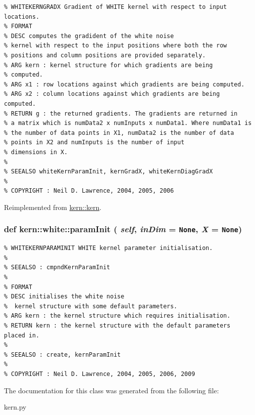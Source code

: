 \footnotesize\begin{verbatim}% WHITEKERNGRADX Gradient of WHITE kernel with respect to input locations.
% FORMAT
% DESC computes the gradident of the white noise
% kernel with respect to the input positions where both the row
% positions and column positions are provided separately.
% ARG kern : kernel structure for which gradients are being
% computed.
% ARG x1 : row locations against which gradients are being computed.
% ARG x2 : column locations against which gradients are being computed.
% RETURN g : the returned gradients. The gradients are returned in
% a matrix which is numData2 x numInputs x numData1. Where numData1 is
% the number of data points in X1, numData2 is the number of data
% points in X2 and numInputs is the number of input
% dimensions in X.
%
% SEEALSO whiteKernParamInit, kernGradX, whiteKernDiagGradX
%
% COPYRIGHT : Neil D. Lawrence, 2004, 2005, 2006

\end{verbatim}
\normalsize
 

Reimplemented from \hyperlink{classkern_1_1kern}{kern::kern}.\hypertarget{classkern_1_1white_c9ce06fb072cdb4e1d769a8a926cc6fc}{
\subsubsection[{paramInit}]{\setlength{\rightskip}{0pt plus 5cm}def kern::white::paramInit ( {\em self}, \/   {\em inDim} = {\tt None}, \/   {\em X} = {\tt None})}}
\label{classkern_1_1white_c9ce06fb072cdb4e1d769a8a926cc6fc}




\footnotesize\begin{verbatim}% WHITEKERNPARAMINIT WHITE kernel parameter initialisation.
%
% SEEALSO : cmpndKernParamInit
%
% FORMAT
% DESC initialises the white noise
%  kernel structure with some default parameters.
% ARG kern : the kernel structure which requires initialisation.
% RETURN kern : the kernel structure with the default parameters placed in.
%
% SEEALSO : create, kernParamInit
%
% COPYRIGHT : Neil D. Lawrence, 2004, 2005, 2006, 2009

\end{verbatim}
\normalsize
 

The documentation for this class was generated from the following file:\begin{CompactItemize}
\item 
kern.py\end{CompactItemize}
